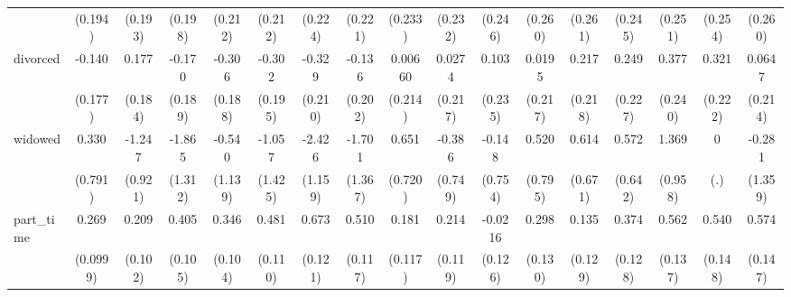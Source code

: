 {\begin{tabular}{l*{16}{c}}
                    &     (0.194)         &     (0.193)         &     (0.198)         &     (0.212)         &     (0.212)         &     (0.224)         &     (0.221)         &     (0.233)         &     (0.232)         &     (0.246)         &     (0.260)         &     (0.261)         &     (0.245)         &     (0.251)         &     (0.254)         &     (0.260)         \\
[1em]
divorced            &      -0.140         &       0.177         &      -0.170         &      -0.306         &      -0.302         &      -0.329         &      -0.136         &     0.00660         &      0.0274         &       0.103         &      0.0195         &       0.217         &       0.249         &       0.377         &       0.321         &      0.0647         \\
                    &     (0.177)         &     (0.184)         &     (0.189)         &     (0.188)         &     (0.195)         &     (0.210)         &     (0.202)         &     (0.214)         &     (0.217)         &     (0.235)         &     (0.217)         &     (0.218)         &     (0.227)         &     (0.240)         &     (0.222)         &     (0.214)         \\
[1em]
widowed             &       0.330         &      -1.247         &      -1.865         &      -0.540         &      -1.057         &      -2.426\sym{*}  &      -1.701         &       0.651         &      -0.386         &      -0.148         &       0.520         &       0.614         &       0.572         &       1.369         &           0         &      -0.281         \\
                    &     (0.791)         &     (0.921)         &     (1.312)         &     (1.139)         &     (1.425)         &     (1.159)         &     (1.367)         &     (0.720)         &     (0.749)         &     (0.754)         &     (0.795)         &     (0.671)         &     (0.642)         &     (0.958)         &         (.)         &     (1.359)         \\
[1em]
part\_time           &       0.269\sym{**} &       0.209\sym{*}  &       0.405\sym{***}&       0.346\sym{***}&       0.481\sym{***}&       0.673\sym{***}&       0.510\sym{***}&       0.181         &       0.214         &     -0.0216         &       0.298\sym{*}  &       0.135         &       0.374\sym{**} &       0.562\sym{***}&       0.540\sym{***}&       0.574\sym{***}\\
                    &    (0.0999)         &     (0.102)         &     (0.105)         &     (0.104)         &     (0.110)         &     (0.121)         &     (0.117)         &     (0.117)         &     (0.119)         &     (0.126)         &     (0.130)         &     (0.129)         &     (0.128)         &     (0.137)         &     (0.148)         &     (0.147)         \\

\end{tabular}}
